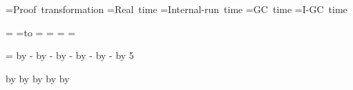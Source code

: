 \def\cebprooflinea#1#2#3#4#5{
\setbox\formulabox = \hbox{(#1)\hskip 5mm #2}
\formulawd = \wd\formulabox
\ifdim #3 > \hsize
  \vbox{
    \vbox{(#1)\hskip 5mm #2}\hfill\break
    \vbox{\turnstile #4}\par
    \vskip 3pt plus 2pt minus 1pt
    \vbox{\raggedleft #5}\par
    \vskip 3pt plus 2pt minus 1pt
  }
\else
  \ifdim \formulawd > #3
    \cebproofline{#1}{#2}{#4}{#5}
  \else
    \formulawd = #3
    \setbox\formulabox = \hbox{#4}
    \advance \formulawd by \wd\formulabox
    \setbox\formulabox = \hbox{#5}
    \advance \formulawd by \wd\formulabox
    \advance \formulawd by 1.5cm
    \ifdim \formulawd > \hsize
      \vbox{
        \vbox{\indent\hbox{\hbox to #3{(#1)\hskip 5mm #2} \turnstile} #4}\par
        \vskip 3pt plus 2pt minus 1pt
        \vbox{\raggedleft #5}\par
        \vskip 3pt plus 2pt minus 1pt
      }
    \else
      \vbox{\indent\hbox{\hbox to #3{(#1)\hskip 5mm #2} \turnstile} #4 \hfill #5}\par
    \fi
  \fi
\fi
}

\def\ceblinejust#1{\par\vbox{\raggedleft{#1}}\par}


\newbox\processname
\newbox\realtime
\newbox\inruntime
\newbox\gctime
\newbox\igctime

\newdimen\processnamewd
\newdimen\realtimewd
\newdimen\inruntimewd
\newdimen\gctimewd
\newdimen\igctimewd
\newdimen\diffwd
\newdimen\ndiffwd

\setbox\processname=\hbox{Proof transformation}
\setbox\realtime=\hbox{Real time}
\setbox\inruntime=\hbox{Internal-run time}
\setbox\gctime=\hbox{GC time}
\setbox\igctime=\hbox{I-GC time}

\processnamewd=\wd\processname
\setbox\processname=\hbox to 
\realtimewd=\wd\realtime
\inruntimewd=\wd\inruntime
\gctimewd=\wd\gctime
\igctimewd=\wd\igctime

\diffwd=\hsize
\advance \diffwd by -\processnamewd
\advance \diffwd by -\realtimewd
\advance \diffwd by -\inruntimewd
\advance \diffwd by -\gctimewd
\advance \diffwd by -\igctimewd
\divide \diffwd by 5

\advance \processnamewd by \diffwd 
\advance \realtimewd by \diffwd 
\advance \inruntimewd by \diffwd 
\advance \gctimewd by \diffwd 
\advance \igctimewd by \diffwd 

